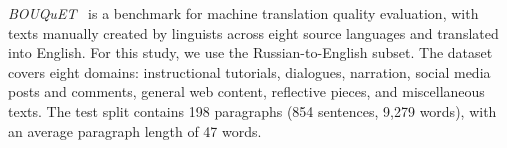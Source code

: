\documentclass[11pt]{article}
\begin{document}




\emph{BOUQuET}~\cite{andrews-etal-2025-bouquet} is a benchmark for machine translation quality evaluation, with texts manually created by linguists across eight source languages and translated into English. For this study, we use the Russian-to-English subset. The dataset covers eight domains: instructional tutorials, dialogues, narration, social media posts and comments, general web content, reflective pieces, and miscellaneous texts. The test split contains 198 paragraphs (854 sentences, 9,279 words), with an average paragraph length of 47 words.


\end{document}
